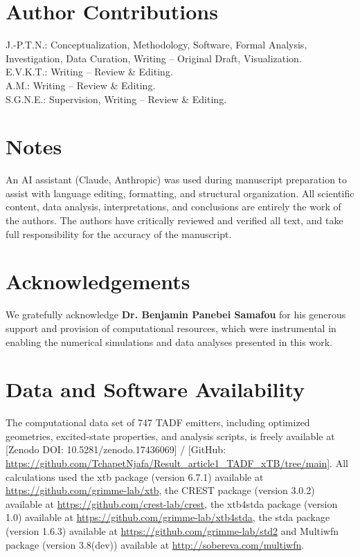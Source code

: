 \documentclass[journal=jcisd8,manuscript=article,keywords=true]{achemso}
\begin{document}
\section*{Author Contributions}
J.-P.T.N.: Conceptualization, Methodology, Software, Formal Analysis, 
Investigation, Data Curation, Writing – Original Draft, Visualization.\\ 
E.V.K.T.: Writing – Review \& Editing. \\
A.M.:  Writing – Review \& Editing. \\
S.G.N.E.: Supervision, Writing – Review \& Editing.

\section*{Notes}
An AI assistant (Claude, Anthropic) was used during manuscript preparation to assist with language editing, formatting, and structural organization. All scientific content, data analysis, interpretations, and conclusions are entirely the work of the authors. The authors have critically reviewed and verified all text, and take full responsibility for the accuracy of the manuscript.

\section*{Acknowledgements}

We gratefully acknowledge \textbf{Dr. Benjamin Panebei Samafou} for his generous support
and provision of computational resources, which were instrumental in enabling the
numerical simulations and data analyses presented in this work.

\section*{Data and Software Availability}
The computational data set of 747 TADF emitters, including optimized 
geometries, excited-state properties, and analysis scripts, is freely 
available at [Zenodo DOI: 10.5281/zenodo.17436069] / [GitHub:
\url{https://github.com/TchapetNjafa/Result_article1_TADF_xTB/tree/main}].
All calculations used the xtb package (version 6.7.1) available at 
\url{https://github.com/grimme-lab/xtb}, the CREST package (version 3.0.2) available at
\url{https://github.com/crest-lab/crest},
the xtb4stda package (version 1.0) available at
\url{https://github.com/grimme-lab/xtb4stda}, the stda package (version 1.6.3) available
at \url{https://github.com/grimme-lab/std2}
and Multiwfn package (version 3.8(dev)) available at \url{http://sobereva.com/multiwfn}.
\end{document}
